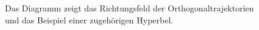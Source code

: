 \begin{atiSolution}
\begin{atiSubtaskSolutions}
\begin{figure}[H]
			\caption{Das Diagramm zeigt das Richtungsfeld der Orthogonaltrajektorien und das Beispiel einer zugehörigen Hyperbel.}
		\end{figure}
	\end{atiSubtaskSolutions}
\end{atiSolution}